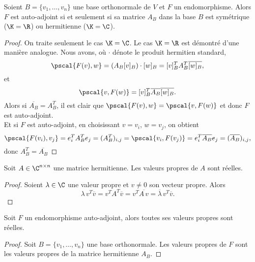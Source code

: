 \begin{theorem}
  \label{thr:14}
  Soient $B = \{v_1,\dots,v_n\}$ une base orthonormale de $V$ et $F$ un endomorphisme. Alors $F$ est auto-adjoint si et seulement si sa matrice $A_B$ dans la base $B$ est symétrique ($\K = \R$) ou hermitienne ($\K = \C$). 
\end{theorem}

\begin{proof}
  On traite seulement le cas $\K=\C$. Le cas $\K = \R$ est démontré d'une manière analogue. Nous avons, où $\cdot$ dénote le produit hermitien standard, 
  \begin{displaymath}
    \pscal{F(v), w} = (A_B [v]_B ) \cdot [w]_B = [v]_B^T A_B^T \overline{[w]_B},
  \end{displaymath}
et 
\begin{displaymath}
  \pscal{v, F(w)}  = [v]_B^T \overline{A_B} \overline{[w]_B}. 
\end{displaymath}
Alors si $\overline{A_B} = A_B^T$, il est clair que $\pscal{F(v), w} = \pscal{v, F(w)}$ et donc $F$ est auto-adjoint. \\
Et si $F$ est auto-adjoint, en choisissant $v = v_i$, $w = v_j$, on obtient 		\begin{displaymath}
	\pscal{F(v_i), v_j} = e_i^TA_B^Te_j = (A_B^T)_{i, j} = \pscal{v_i, F(v_j)} = e_i^T \overline{A_B} e_j = (\overline{A_B})_{i, j},
	\end{displaymath}
donc $A_B^T = \overline{A_B}$
\end{proof}


\begin{lemma}
  \label{lem:8}
  Soit $A \in \C^{n \times n}$ une matrice hermitienne. Les valeurs propres de $A$ sont réelles. 
\end{lemma}
\begin{proof}
  Soient $\lambda \in \C$ une valeur propre et $v \neq 0$ son vecteur propre. Alors 
  \begin{displaymath}
    \lambda \, v^T \overline{v}  = v^T {A}^T \overline{v} = 
    v^T \overline{A \, v} = \overline{\lambda}  \, v^T \overline{v}. 
  \end{displaymath}
\end{proof}


\begin{corollary}
\label{co:3}
Soit $F$
un endomorphisme auto-adjoint, alors toutes ses valeurs propres sont
réelles.
\end{corollary}
\begin{proof}
  Soit $B = \{v_1,\dots,v_n\}$
  une base orthonormale. Les valeurs propres de $F$
  sont les valeurs propres de la matrice hermitienne $A_B$.
\end{proof}

